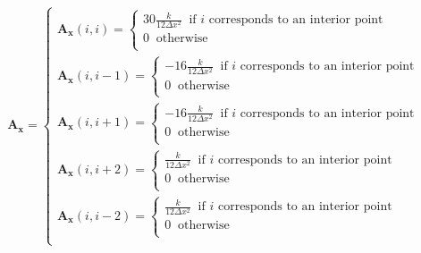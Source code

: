 \documentclass[12 pt, final]{article}
\begin{document}
\begin{itemize}
\begin{itemize}
\begin{enumerate}
        \begin{align*}
                    \mathbf{A_x} = \begin{cases}
                    \mathbf{A_x}(i,i) =
                    \begin{cases}
                    30\frac{k}{12\Delta x^2} \: \text{ if $i$ corresponds to an interior point}\:\\
                    0 \: \text{ otherwise}\:\\
                    \end{cases}\\
                    \mathbf{A_x}(i,i-1) =
                    \begin{cases}
                    -16\frac{k}{12\Delta x^2} \: \text{ if $i$ corresponds to an interior point}\:\\
                    0 \: \text{ otherwise}\:\\
                    \end{cases}\\
                    \mathbf{A_x}(i,i+1) =
                    \begin{cases}
                    -16\frac{k}{12\Delta x^2} \: \text{ if $i$ corresponds to an interior point}\:\\
                    0 \: \text{ otherwise}\:\\
                    \end{cases}\\
                    \mathbf{A_x}(i,i+2) =
                    \begin{cases}
                    \frac{k}{12\Delta x^2} \: \text{ if $i$ corresponds to an interior point}\:\\
                    0 \: \text{ otherwise}\:\\
                    \end{cases}\\
                    \mathbf{A_x}(i,i-2) =
                    \begin{cases}
                    \frac{k}{12\Delta x^2} \: \text{ if $i$ corresponds to an interior point}\:\\
                    0 \: \text{ otherwise}\:\\
                    \end{cases}\\                    
                    \end{cases}\\
            \end{align*}

\end{enumerate}
\end{itemize}
\end{itemize}
\end{document}
